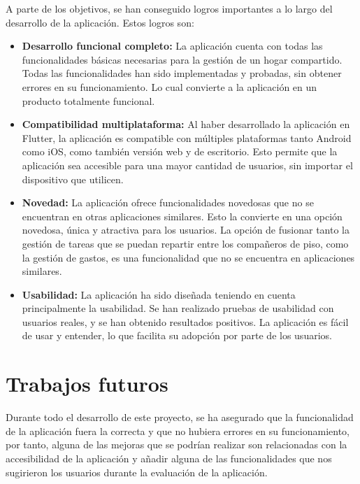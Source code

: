 A parte de los objetivos, se han conseguido logros importantes a lo largo del desarrollo de la aplicación. Estos logros son: 

\begin{itemize}
     \item \textbf{Desarrollo funcional completo:} La aplicación cuenta con todas las funcionalidades básicas necesarias para la gestión de un hogar compartido. Todas las funcionalidades han sido implementadas y probadas, sin obtener errores en su funcionamiento. Lo cual convierte a la aplicación en un producto totalmente funcional.
     \item \textbf{Compatibilidad multiplataforma:} Al haber desarrollado la aplicación en Flutter, la aplicación es compatible con múltiples plataformas tanto Android como iOS, como también versión web y de escritorio. Esto permite que la aplicación sea accesible para una mayor cantidad de usuarios, sin importar el dispositivo que utilicen.
     \item \textbf{Novedad:} La aplicación ofrece funcionalidades novedosas que no se encuentran en otras aplicaciones similares. Esto la convierte en una opción novedosa, única y atractiva para los usuarios. La opción de fusionar tanto la gestión de tareas que se puedan repartir entre los compañeros de piso, como la gestión de gastos, es una funcionalidad que no se encuentra en aplicaciones similares.
     \item \textbf{Usabilidad:} La aplicación ha sido diseñada teniendo en cuenta principalmente la usabilidad. Se han realizado pruebas de usabilidad con usuarios reales, y se han obtenido resultados positivos. La aplicación es fácil de usar y entender, lo que facilita su adopción por parte de los usuarios.
\end{itemize}





\section{Trabajos futuros}

Durante todo el desarrollo de este proyecto, se ha asegurado que la funcionalidad de la aplicación fuera la correcta y que no hubiera errores 
en su funcionamiento, por tanto, alguna de las mejoras que se podrían realizar son relacionadas con la accesibilidad de la aplicación y añadir 
alguna de las funcionalidades que nos sugirieron los usuarios durante la evaluación de la aplicación.

